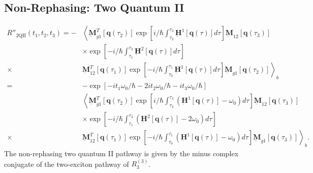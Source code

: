 \documentclass{article}
\newcommand{\bra}[1]{\ensuremath{\left\langle#1\right|}}
\newcommand{\ket}[1]{\ensuremath{\left|#1\right\rangle}}
\newcommand{\vect}[1]{\ensuremath{\boldsymbol{\mathbf{#1}}}}
\newcommand{\arw}{-{Latex[length=2mm]}}
\begin{document}
\clearpage
\subsection{Non-Rephasing: Two Quantum II}
\begin{figure}[h]
\centering
{}
\end{figure}
\begin{equation}
\begin{split}
 R''_\mathrm{2QII}(t_{1},t_{2},t_{3})=-
 &\left\langle\underbar{\vect{M}}_{g1}^{T}[\vect q(\tau_{2})]\exp\left[i/\hbar\int_{\tau_{2}}^{\tau_{3}}\underbar{\vect{H}}^{1}[\vect q(\tau)]d\tau\right] \underbar{\vect{M}}_{12} [\vect q(\tau_{3})]\right.\\
 &\times\exp\left[-i/\hbar\int_{\tau_{1}}^{\tau_{3}}\underbar{\vect{H}}^{2}[\vect q(\tau)]d\tau\right]\\
 \times&\left.\underbar{\vect{M}}_{12}^{T}[\vect q(\tau_{1})]\exp\left[-i/\hbar\int_{\tau_{0}}^{\tau_{1}}\underbar{\vect{H}}^{1}[\vect q(\tau)]d\tau\right] \underbar{\vect{M}}_{g1} [\vect q(\tau_{2})]\right\rangle_{b}\\
 =&-\exp\left[-i t_{1}\omega_{0}/\hbar-2it_{2}\omega_{0}/\hbar-it_{3}\omega_{0}/\hbar\right]\\
 &\left\langle\underbar{\vect{M}}_{g1}^{T}[\vect q(\tau_{2})]\exp\left[i/\hbar\int_{\tau_{2}}^{\tau_{3}}\left(\underbar{\vect{H}}^{1}[\vect q(\tau)]-\omega_{0}\right)d\tau\right] \underbar{\vect{M}}_{12} [\vect q(\tau_{3})]\right.\\
 &\times\exp\left[-i/\hbar\int_{\tau_{1}}^{\tau_{3}}\left(\underbar{\vect{H}}^{2}[\vect q(\tau)]-2\omega_{0}\right)d\tau\right]\\
 \times&\left.\underbar{\vect{M}}_{12}^{T}[\vect q(\tau_{1})]\exp\left[-i/\hbar\int_{\tau_{0}}^{\tau_{1}}\left(\underbar{\vect{H}}^{1}[\vect q(\tau)]-\omega_{0}\right)d\tau\right] \underbar{\vect{M}}_{g1} [\vect q(\tau_{3})]\right\rangle_{b}.
\end{split}
\end{equation}
The non-rephasing two quantum II pathway is given by the minus complex conjugate of the two-exciton pathway of $R_{3}^{(3)}$.\cite{Hamm2011}
\end{document}
